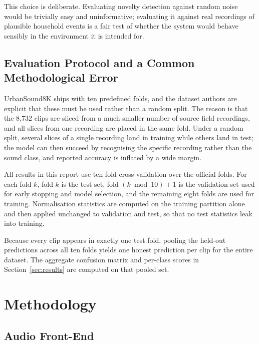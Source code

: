 \documentclass[11pt, a4paper]{article}
\begin{document}
This choice is deliberate. Evaluating novelty detection against random noise would be trivially easy and uninformative; evaluating it against real recordings of plausible household events is a fair test of whether the system would behave sensibly in the environment it is intended for.

\subsection{Evaluation Protocol and a Common Methodological Error}
\label{sec:protocol}

UrbanSound8K ships with ten predefined folds, and the dataset authors are explicit that these must be used rather than a random split. The reason is that the 8,732 clips are sliced from a much smaller number of source field recordings, and all slices from one recording are placed in the same fold. Under a random split, several slices of a single recording land in training while others land in test; the model can then succeed by recognising the specific recording rather than the sound class, and reported accuracy is inflated by a wide margin.

All results in this report use ten-fold cross-validation over the official folds. For each fold $k$, fold $k$ is the test set, fold $(k \bmod 10) + 1$ is the validation set used for early stopping and model selection, and the remaining eight folds are used for training. Normalisation statistics are computed on the training partition alone and then applied unchanged to validation and test, so that no test statistics leak into training.

Because every clip appears in exactly one test fold, pooling the held-out predictions across all ten folds yields one honest prediction per clip for the entire dataset. The aggregate confusion matrix and per-class scores in Section~\ref{sec:results} are computed on that pooled set.

\section{Methodology}
\label{sec:method}

\subsection{Audio Front-End}
\end{document}
